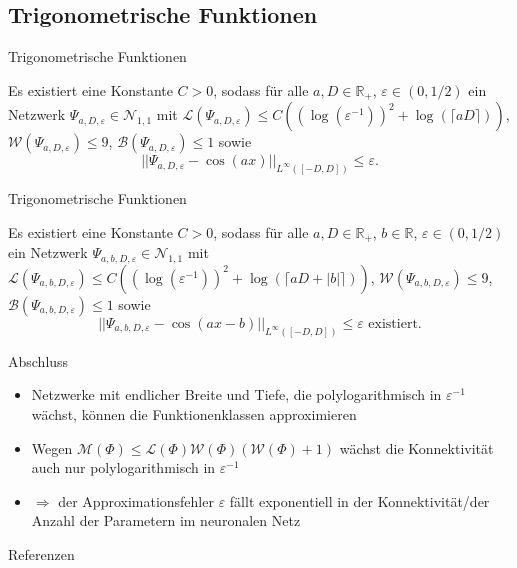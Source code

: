 \documentclass[10pt,aspectratio=169]{beamer}
\newcommand{\R}{\mathbb{R}} %
\begin{document}
\subsection{Trigonometrische Funktionen}

\begin{frame}{Trigonometrische Funktionen}
    \begin{theorem} %
        \newcommand{\Psia}{\Psi_{a,D,\varepsilon}}
        Es existiert eine Konstante \(C>0\), sodass für alle \(a,D\in \R_+\), \(\varepsilon \in (0,1/2)\) 
        ein Netzwerk \(\Psia \in \mathcal{N}_{1,1}\) mit \(\mathcal{L}(\Psia) \leq C((\log(\varepsilon^{-1}))^2 + \log(\lceil aD\rceil))\), 
        \(\mathcal{W}(\Psia) \leq 9\), \(\mathcal{B}(\Psia) \leq 1\) sowie 
        \[ ||\Psia - \cos(a x) ||_{L^{\infty}([-D,D])} \leq \varepsilon. \]
    \end{theorem}
\end{frame}

\begin{frame}{Trigonometrische Funktionen}
    \begin{corollary} %
        \newcommand{\Psia}{\Psi_{a,b,D,\varepsilon}}
        Es existiert eine Konstante \(C>0\), sodass für alle \(a,D\in \R_+\), \(b\in \R\), \(\varepsilon \in (0,1/2)\) 
        ein Netzwerk \(\Psia \in \mathcal{N}_{1,1} \) mit 
        \(\mathcal{L}(\Psia) \leq C((\log(\varepsilon^{-1}))^2 + \log(\lceil a D + |b| \rceil))\), 
        \(\mathcal{W}(\Psia) \leq 9\), \(\mathcal{B}(\Psia) \leq 1\) sowie 
        \[ ||\Psia - \cos(a x - b) ||_{L^\infty([-D,D])} \leq \varepsilon \text{ existiert}. \]
    \end{corollary}
\end{frame}

\begin{frame}{Abschluss} %
    \begin{itemize}
        \item Netzwerke mit endlicher Breite und Tiefe, die polylogarithmisch in \(\varepsilon^{-1}\) wächst, können die Funktionenklassen approximieren \pause
        \item Wegen \(\mathcal{M}(\Phi) \leq \mathcal{L}(\Phi) \mathcal{W}(\Phi)(\mathcal{W}(\Phi) + 1)\) wächst die Konnektivität auch nur polylogarithmisch in \(\varepsilon^{-1}\) \pause
        \item \( \Rightarrow \) der Approximationsfehler \(\varepsilon\) fällt exponentiell in der Konnektivität/der Anzahl der Parametern im neuronalen Netz
    \end{itemize}
\end{frame}

\begin{frame}{Referenzen}
    \footnotesize
    \nocite{Grohs2019}
    \printbibliography[heading=none]
\end{frame}
\end{document}
